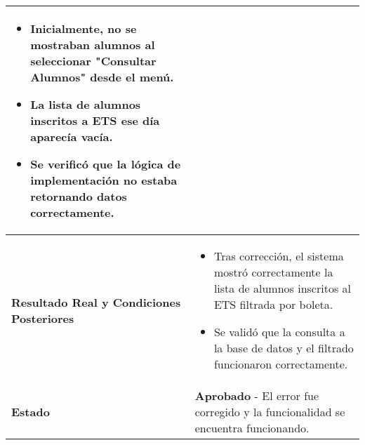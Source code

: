 \begin{longtable}{|p{5cm}|p{10cm}|}
\begin{itemize}
		\item Inicialmente, no se mostraban alumnos al seleccionar "Consultar Alumnos" desde el menú.
		\item La lista de alumnos inscritos a ETS ese día aparecía vacía.
		\item Se verificó que la lógica de implementación no estaba retornando datos correctamente.
	\end{itemize} \\
	\hline
	\textbf{Resultado Real y Condiciones Posteriores} & 
	\begin{itemize}
		\item Tras corrección, el sistema mostró correctamente la lista de alumnos inscritos al ETS filtrada por boleta.
		\item Se validó que la consulta a la base de datos y el filtrado funcionaron correctamente.
	\end{itemize} \\
	\hline
	\textbf{Estado} & 
	\textbf{Aprobado} - El error fue corregido y la funcionalidad se encuentra funcionando. \\
	\hline
\end{longtable}